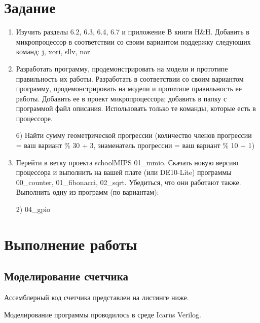 \documentclass[a4paper,14pt]{article}
\begin{document}
	
	\tableofcontents
	\pagebreak
	\section{Задание}
	
	\begin{enumerate}
		\item Изучить разделы 6.2, 6.3, 6.4, 6.7 и приложение В книги H\&H.
		Добавить в микропроцессор в соответствии со своим вариантом	поддержку следующих команд: j, xori, sllv, nor.
		
		\item Разработать программу, продемонстрировать на модели и прототипе правильность их	работы.
		Разработать в соответствии со своим вариантом программу, продемонстрировать на модели и прототипе правильность ее работы.
		Добавить ее в проект микропроцессора; добавить в папку с программой файл описания.
		Использовать только те команды, которые есть в процессоре.
		
		6) Найти сумму геометрической прогрессии (количество членов прогрессии = ваш
		вариант \% 30 + 3, знаменатель прогрессии = ваш вариант \% 10 + 1)
		
		\item Перейти в ветку проекта schoolMIPS 01\_mmio.
		Скачать новую версию процессора и выполнить на вашей плате (или DE10-Lite)
		программы 00\_counter, 01\_fibonacci, 02\_sqrt. Убедиться, что они работают также.
		Выполнить одну из программ (по вариантам):
		
		2) 04\_gpio
	\end{enumerate}

	
	\section{Выполнение работы}
	
	\subsection{Моделирование счетчика}
	
	Ассемблерный код счетчика представлен на листинге ниже.
	
	{\small {}}
	
	Моделирование программы проводилось в среде Icarus Verilog.
	
\end{document}
